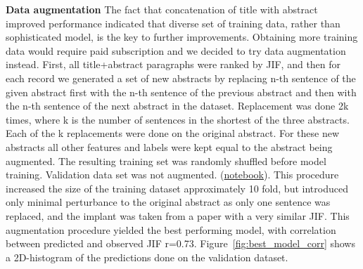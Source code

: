 \documentclass[11pt]{article}
\begin{document}
\textbf{Data augmentation} The fact that concatenation of title with abstract improved performance indicated that diverse set of training data, rather than sophisticated model, is the key to further improvements. Obtaining more training data would require paid subscription and we decided to try data augmentation instead. First, all title+abstract paragraphs were ranked by JIF, and then for each record we generated a set of new abstracts by replacing n-th sentence of the given abstract first with the n-th sentence of the previous abstract and then with the n-th sentence of the next abstract in the dataset. Replacement was done 2k times, where k is the number of sentences in the shortest of the three abstracts. Each of the k replacements were done on the original abstract. For these new abstracts all other features and labels were kept equal to the abstract being augmented. The resulting training set was randomly shuffled before model training. Validation data set was not augmented. (\href{https://github.com/ArtemChemist/w266_project/blob/main/Notebooks/sciBERT%20aug.ipynb}{notebook}). This procedure increased the size of the training dataset approximately 10 fold, but introduced only minimal perturbance to the original abstract as only one sentence was replaced, and the implant was taken from a paper with a very similar JIF. This augmentation procedure yielded the best performing model, with correlation between predicted and observed JIF r=0.73. Figure~\ref{fig:best_model_corr} shows a 2D-histogram of the predictions done on the validation dataset.
\end{document}
